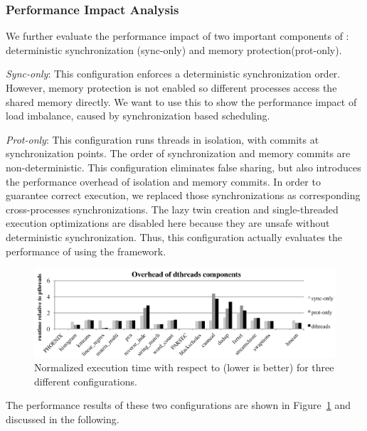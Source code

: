\subsubsection{Performance Impact Analysis}
We further evaluate the performance impact of two important components of \dthreads: deterministic synchronization (sync-only) and memory protection(prot-only).

\emph{Sync-only}: This configuration enforces a deterministic synchronization order. However, memory protection is not enabled so different processes access the shared memory directly. We want to use this to show the performance impact of load imbalance, caused by synchronization based scheduling.

\emph{Prot-only}: This configuration runs threads in isolation, with commits at synchronization points. The order of synchronization and memory commits are non-deterministic. This configuration eliminates false sharing, but also introduces the performance overhead of isolation and memory commits. In order to guarantee correct execution, we replaced those synchronizations as corresponding cross-processes synchronizations. The lazy twin creation and single-threaded execution optimizations are disabled here because they are unsafe without deterministic synchronization. Thus, this configuration actually evaluates the performance of using the \sheriff{} framework. 


\begin{figure}[!t]
{\centering
\includegraphics[width=6in]{dthreads/figure/perfeffect}
\caption{Normalized execution time with respect to \pthreads{} (lower is better) for three different configurations. 
\label{fig:perfanalysis}}
}
\end{figure}

The performance results of these two configurations are shown in Figure~\ref{fig:perfanalysis} and discussed in the following.

